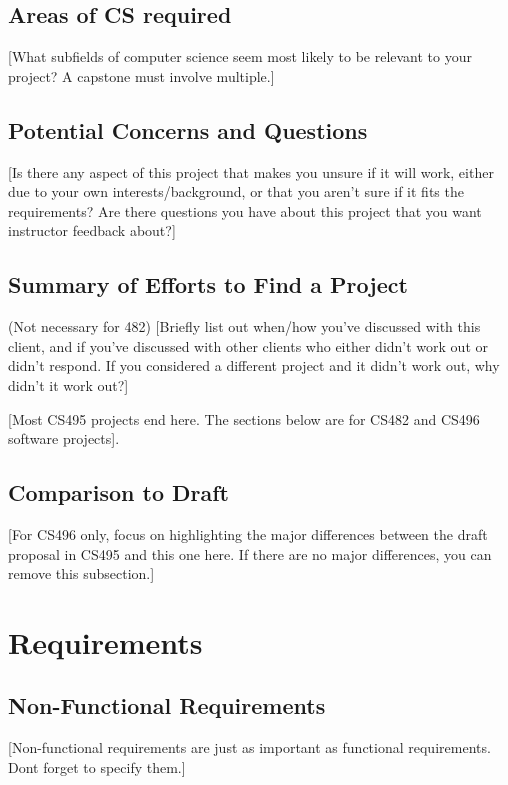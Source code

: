 \documentclass{article}
\begin{document}
\subsection{Areas of CS required}
[What subfields of computer science seem most likely to be relevant to your project? A capstone must involve multiple.]

\subsection{Potential Concerns and Questions}
[Is there any aspect of this project that makes you unsure if it will work, either due to your own interests/background, or that you aren't sure if it fits the requirements? Are there questions you have about this project that you want instructor feedback about?]

\subsection{Summary of Efforts to Find a Project}
(Not necessary for 482) [Briefly list out when/how you've discussed with this client, and if you've discussed with other clients who either didn't work out or didn't respond. If you considered a different project and it didn't work out, why didn't it work out?] 

[Most CS495 projects end here. The sections below are for CS482 and CS496 software projects].

\subsection{Comparison to Draft}
[For CS496 only, focus on highlighting the major differences between the draft proposal in CS495 and this one here. If there are no major differences, you can remove this subsection.]

\section{Requirements}

\subsection{Non-Functional Requirements}
[Non-functional requirements are just as important as functional requirements. Dont forget to specify them.]
\end{document}
